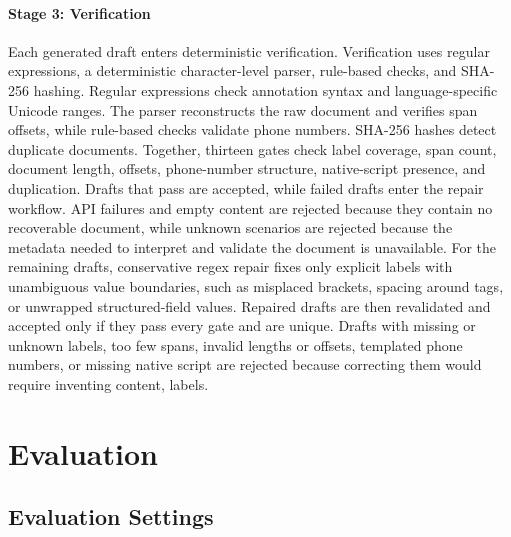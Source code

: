 \documentclass[11pt]{article}
\begin{document}
\paragraph{Stage 3: Verification} Each generated draft enters deterministic verification. Verification uses regular expressions, a deterministic character-level parser, rule-based checks, and SHA-256 hashing. Regular expressions check annotation syntax and language-specific Unicode ranges. The parser reconstructs the raw document and verifies span offsets, while rule-based checks validate phone numbers. SHA-256 hashes detect duplicate documents. Together, thirteen gates check label coverage, span count, document length, offsets, phone-number structure, native-script presence, and duplication. Drafts that pass are accepted, while failed drafts enter the repair workflow. API failures and empty content are rejected because they contain no recoverable document, while unknown scenarios are rejected because the metadata needed to interpret and validate the document is unavailable. For the remaining drafts, conservative regex repair fixes only explicit labels with unambiguous value boundaries, such as misplaced brackets, spacing around tags, or unwrapped structured-field values. Repaired drafts are then revalidated and accepted only if they pass every gate and are unique. Drafts with missing or unknown labels, too few spans, invalid lengths or offsets, templated phone numbers, or missing native script are rejected because correcting them would require inventing content, labels.

\section{Evaluation}

\subsection{Evaluation Settings}
\end{document}
